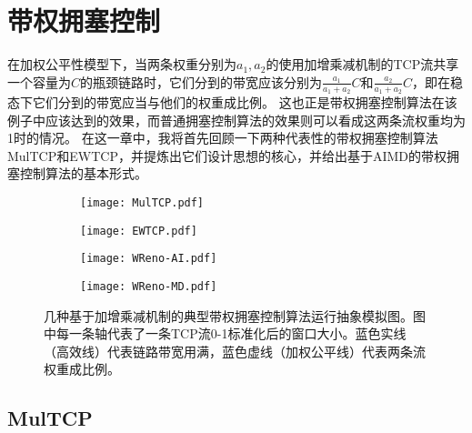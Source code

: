 \documentclass[winfonts]{njuthesis}
\begin{document}
\chapter{带权拥塞控制}\label{chapter:wcc}

在加权公平性模型下，当两条权重分别为$a_1, a_2$的使用加增乘减机制的TCP流共享一个容量为$C$的瓶颈链路时，它们分到的带宽应该分别为$\frac{a_1}{a_1 + a_2}C$和$\frac{a_2}{a_1 + a_2}C$，即在稳态下它们分到的带宽应当与他们的权重成比例。
这也正是带权拥塞控制算法在该例子中应该达到的效果，而普通拥塞控制算法的效果则可以看成这两条流权重均为1时的情况。
在这一章中，我将首先回顾一下两种代表性的带权拥塞控制算法MulTCP\cite{crowcroft1998differentiated}和EWTCP\cite{wischik2011design}，并提炼出它们设计思想的核心，并给出基于AIMD的带权拥塞控制算法的基本形式。

\begin{figure}[ht!]
  \centering
  \begin{subfigure}{.4\textwidth}
    \centering
      \texttt{[image: MulTCP.pdf]}
      \label{fig:MulTCP}
  \end{subfigure}
  \hspace{1em}
  \begin{subfigure}{.4\textwidth}
    \centering
      \texttt{[image: EWTCP.pdf]}
      \label{fig:EWTCP}
  \end{subfigure}
  \begin{subfigure}{.4\textwidth}
    \centering
      \texttt{[image: WReno-AI.pdf]}
      \label{fig:WReno-AI}
  \end{subfigure}
  \hspace{1em}
  \begin{subfigure}{.4\textwidth}
    \centering
      \texttt{[image: WReno-MD.pdf]}
      \label{fig:WReno-MD}
  \end{subfigure}
  \caption{几种基于加增乘减机制的典型带权拥塞控制算法运行抽象模拟图。图中每一条轴代表了一条TCP流0-1标准化后的窗口大小。蓝色实线（高效线）代表链路带宽用满，蓝色虚线（加权公平线）代表两条流权重成比例。}
\label{fig:AIMD}
\end{figure}

\section{MulTCP}
\end{document}
